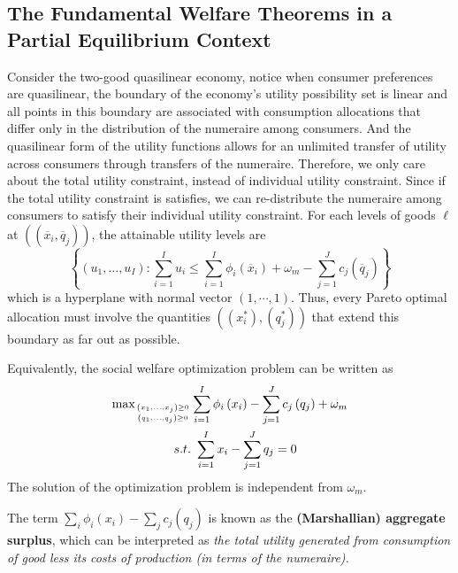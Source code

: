 \documentclass{report}
\begin{document}
	 \subsection{The Fundamental Welfare Theorems in a Partial Equilibrium Context}
	 	\begin{remark} Consider the two-good quasilinear economy, notice when consumer preferences are quasilinear, the boundary of the economy's utility possibility set is linear and all points in this boundary are associated with consumption allocations that differ only in the distribution of the numeraire among consumers. And the quasilinear form of the utility functions allows for an unlimited transfer of utility across consumers through transfers of the numeraire. Therefore, we only care about the total utility constraint, instead of individual utility constraint. Since if the total utility constraint is satisfies, we can re-distribute the numeraire among consumers to satisfy their individual utility constraint. For each levels of goods $\ell$ at $((\overline{x}_i, \overline{q}_j))	$, the attainable utility levels are
	 		\begin{equation}
	 			\left\{\left(u_{1}, \ldots, u_{I}\right) : \sum_{i=1}^{I} u_{i} \leq \sum_{i=1}^{I} \phi_{i}\left(\overline{x}_{i}\right)+\omega_{m}-\sum_{j=1}^{J} c_{j}\left(\overline{q}_{j}\right)\right\}
	 		\end{equation}
	 		which is a hyperplane with normal vector $(1, \cdots, 1)$. Thus, every Pareto optimal allocation must involve the quantities $((x_i^*), (q_j^*))$ that extend this boundary as far out as possible.
	 	\end{remark}
		
		\begin{definition}
			Equivalently, the social welfare optimization problem can be written as 
			\begin{align}
				\operatorname{max}_{\left(x_{1}, \ldots, x_{j}\right) \geq 0 \atop\left(q_{1}, \ldots, q_{j}\right) \geq 0}& \sum_{i=1}^{I} \phi_{i}\left(x_{i}\right)-\sum_{j=1}^{J} c_{j}\left(q_{j}\right)+\omega_{m} \\
				s.t.&\ \sum_{i=1}^{I} x_{i}-\sum_{j=1}^{J} q_{j}=0
			\end{align}
			The solution of the optimization problem is independent from $\omega_m$.
		\end{definition}
		
		\begin{definition}
			The term $\sum_{i} \phi_{i}\left(x_{i}\right)-\sum_{j} c_{j}\left(q_{j}\right)$ is known as the \textbf{(Marshallian) aggregate surplus}, which can be interpreted as \emph{the total utility generated from consumption of good less its costs of production (in terms of the numeraire).}
		\end{definition}
		
\end{document}
